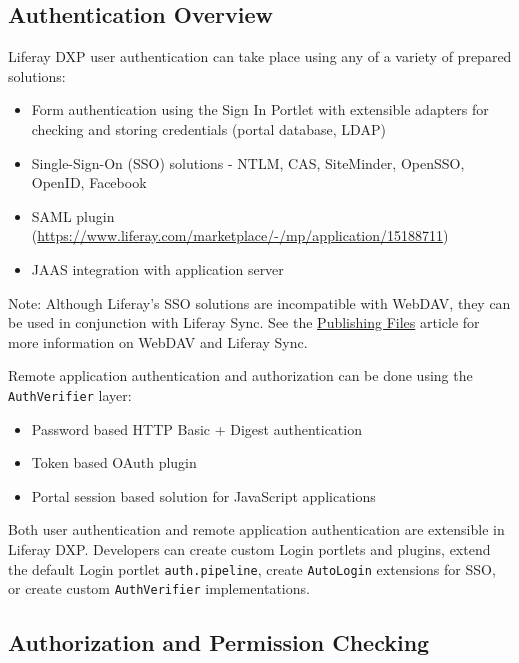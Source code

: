 \subsection{Authentication Overview}\label{authentication-overview}

Liferay DXP user authentication can take place using any of a variety of
prepared solutions:

\begin{itemize}
\tightlist
\item
  Form authentication using the Sign In Portlet with extensible adapters
  for checking and storing credentials (portal database, LDAP)
\item
  Single-Sign-On (SSO) solutions - NTLM, CAS, SiteMinder, OpenSSO,
  OpenID, Facebook
\item
  SAML plugin
  (\url{https://www.liferay.com/marketplace/-/mp/application/15188711})
\item
  JAAS integration with application server
\end{itemize}

Note: Although Liferay's SSO solutions are incompatible with WebDAV,
they can be used in conjunction with Liferay Sync. See the
\href{/docs/7-0/user/-/knowledge_base/u/publishing-files}{Publishing
Files} article for more information on WebDAV and Liferay Sync.

Remote application authentication and authorization can be done using
the \texttt{AuthVerifier} layer:

\begin{itemize}
\tightlist
\item
  Password based HTTP Basic + Digest authentication
\item
  Token based OAuth plugin
\item
  Portal session based solution for JavaScript applications
\end{itemize}

Both user authentication and remote application authentication are
extensible in Liferay DXP. Developers can create custom Login portlets
and plugins, extend the default Login portlet \texttt{auth.pipeline},
create \texttt{AutoLogin} extensions for SSO, or create custom
\texttt{AuthVerifier} implementations.

\subsection{Authorization and Permission
Checking}\label{authorization-and-permission-checking}

